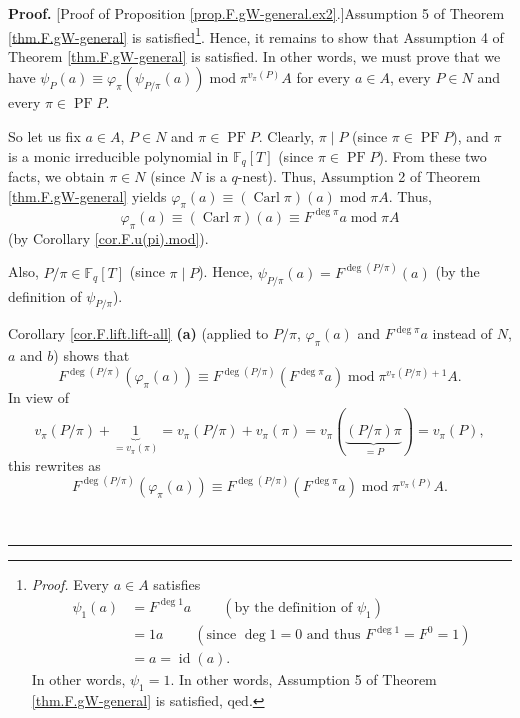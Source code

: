 \documentclass[numbers=enddot,12pt,final,onecolumn,notitlepage]{scrartcl}%
\theoremstyle{definition}
\newenvironment{proof}[1][Proof]{\noindent\textbf{#1.} }{\ \rule{0.5em}{0.5em}}
\begin{document}
\begin{proof}
[Proof of Proposition \ref{prop.F.gW-general.ex2}.]Assumption 5 of Theorem
\ref{thm.F.gW-general} is satisfied\footnote{\textit{Proof.} Every $a\in A$
satisfies
\begin{align*}
\psi_{1}\left(  a\right)   &  =F^{\deg1}a\ \ \ \ \ \ \ \ \ \ \left(  \text{by
the definition of }\psi_{1}\right) \\
&  =1a\ \ \ \ \ \ \ \ \ \ \left(  \text{since }\deg1=0\text{ and thus }%
F^{\deg1}=F^{0}=1\right) \\
&  =a=\operatorname*{id}\left(  a\right)  .
\end{align*}
In other words, $\psi_{1}=1$. In other words, Assumption 5 of Theorem
\ref{thm.F.gW-general} is satisfied, qed.}. Hence, it remains to show that
Assumption 4 of Theorem \ref{thm.F.gW-general} is satisfied. In other words,
we must prove that we have $\psi_{P}\left(  a\right)  \equiv\varphi_{\pi
}\left(  \psi_{P/\pi}\left(  a\right)  \right)  \operatorname{mod}\pi^{v_{\pi
}\left(  P\right)  }A$ for every $a\in A$, every $P\in N$ and every $\pi
\in\operatorname*{PF}P$.

So let us fix $a\in A$, $P\in N$ and $\pi\in\operatorname*{PF}P$. Clearly,
$\pi\mid P$ (since $\pi\in\operatorname*{PF}P$), and $\pi$ is a monic
irreducible polynomial in $\mathbb{F}_{q}\left[  T\right]  $ (since $\pi
\in\operatorname*{PF}P$). From these two facts, we obtain $\pi\in N$ (since
$N$ is a $q$-nest). Thus, Assumption 2 of Theorem \ref{thm.F.gW-general}
yields $\varphi_{\pi}\left(  a\right)  \equiv\left(  \operatorname*{Carl}%
\pi\right)  \left(  a\right)  \operatorname{mod}\pi A$. Thus,%
\begin{equation}
\varphi_{\pi}\left(  a\right)  \equiv\left(  \operatorname*{Carl}\pi\right)
\left(  a\right)  \equiv F^{\deg\pi}a\operatorname{mod}\pi A
\label{pf.prop.F.gW-general.ex2.0}%
\end{equation}
(by Corollary \ref{cor.F.u(pi).mod}).

Also, $P/\pi\in\mathbb{F}_{q}\left[  T\right]  $ (since $\pi\mid P$). Hence,
$\psi_{P/\pi}\left(  a\right)  =F^{\deg\left(  P/\pi\right)  }\left(
a\right)  $ (by the definition of $\psi_{P/\pi}$).

Corollary \ref{cor.F.lift.lift-all} \textbf{(a)} (applied to $P/\pi$,
$\varphi_{\pi}\left(  a\right)  $ and $F^{\deg\pi}a$ instead of $N$, $a$ and
$b$) shows that%
\[
F^{\deg\left(  P/\pi\right)  }\left(  \varphi_{\pi}\left(  a\right)  \right)
\equiv F^{\deg\left(  P/\pi\right)  }\left(  F^{\deg\pi}a\right)
\operatorname{mod}\pi^{v_{\pi}\left(  P/\pi\right)  +1}A.
\]
In view of
\[
v_{\pi}\left(  P/\pi\right)  +\underbrace{1}_{=v_{\pi}\left(  \pi\right)
}=v_{\pi}\left(  P/\pi\right)  +v_{\pi}\left(  \pi\right)  =v_{\pi}\left(
\underbrace{\left(  P/\pi\right)  \pi}_{=P}\right)  =v_{\pi}\left(  P\right)
,
\]
this rewrites as
\begin{equation}
F^{\deg\left(  P/\pi\right)  }\left(  \varphi_{\pi}\left(  a\right)  \right)
\equiv F^{\deg\left(  P/\pi\right)  }\left(  F^{\deg\pi}a\right)
\operatorname{mod}\pi^{v_{\pi}\left(  P\right)  }A.
\label{pf.prop.F.gW-general.ex2.a1}%
\end{equation}



\end{proof}
\end{document}
